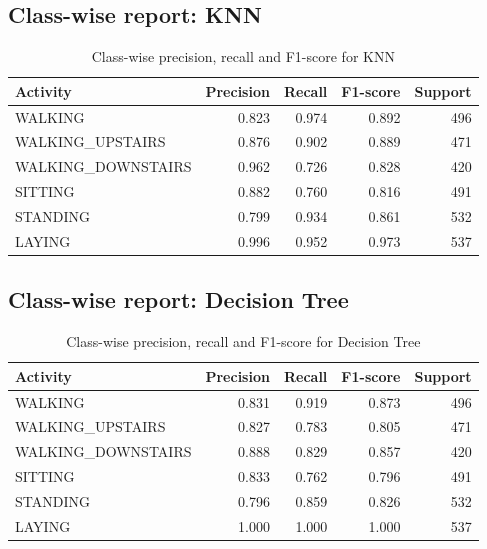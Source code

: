 \subsection{Class-wise report: KNN}
\begin{table}[H]\centering
\caption{Class-wise precision, recall and F1-score for KNN}
\begin{tabular}{lrrrr}
\toprule
\textbf{Activity} & \textbf{Precision} & \textbf{Recall} & \textbf{F1-score} & \textbf{Support}\\
\midrule
WALKING & 0.823 & 0.974 & 0.892 & 496 \\
WALKING\_UPSTAIRS & 0.876 & 0.902 & 0.889 & 471 \\
WALKING\_DOWNSTAIRS & 0.962 & 0.726 & 0.828 & 420 \\
SITTING & 0.882 & 0.760 & 0.816 & 491 \\
STANDING & 0.799 & 0.934 & 0.861 & 532 \\
LAYING & 0.996 & 0.952 & 0.973 & 537 \\
\bottomrule
\end{tabular}
\end{table}

\subsection{Class-wise report: Decision Tree}
\begin{table}[H]\centering
\caption{Class-wise precision, recall and F1-score for Decision Tree}
\begin{tabular}{lrrrr}
\toprule
\textbf{Activity} & \textbf{Precision} & \textbf{Recall} & \textbf{F1-score} & \textbf{Support}\\
\midrule
WALKING & 0.831 & 0.919 & 0.873 & 496 \\
WALKING\_UPSTAIRS & 0.827 & 0.783 & 0.805 & 471 \\
WALKING\_DOWNSTAIRS & 0.888 & 0.829 & 0.857 & 420 \\
SITTING & 0.833 & 0.762 & 0.796 & 491 \\
STANDING & 0.796 & 0.859 & 0.826 & 532 \\
LAYING & 1.000 & 1.000 & 1.000 & 537 \\
\bottomrule
\end{tabular}
\end{table}

